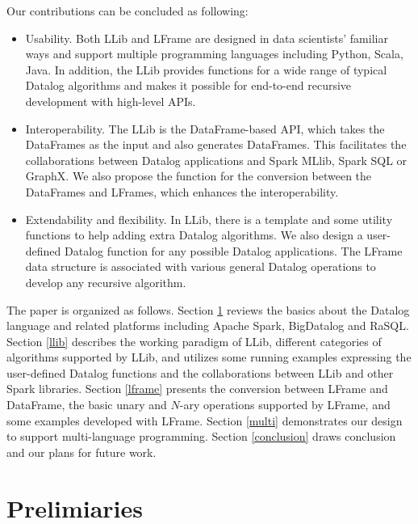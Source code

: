 Our contributions can be concluded as following:
\begin{itemize}
	\item Usability. Both LLib and LFrame are designed in data scientists' familiar ways and support multiple programming languages including Python, Scala, Java. In addition, the LLib  provides functions for a wide range of typical Datalog algorithms and makes it possible for end-to-end  recursive development  with high-level APIs.
	\item Interoperability. The LLib is the DataFrame-based API, which takes the DataFrames as the input and also generates DataFrames. This facilitates the collaborations between Datalog applications and Spark MLlib, Spark SQL or GraphX. We also propose the function for the conversion between the  DataFrames and LFrames, which enhances the interoperability.
	\item Extendability and flexibility. In LLib, there is a template and some utility functions to help  adding extra Datalog algorithms. We also design a user-defined Datalog function for any possible Datalog applications. The LFrame data structure is associated with various general Datalog operations to develop any recursive algorithm.
\end{itemize}
The paper is organized as follows. Section \ref{pre} reviews the basics about the Datalog language and related platforms including Apache Spark, BigDatalog and RaSQL. Section \ref{llib} describes the working paradigm of LLib,  different categories of algorithms supported by LLib, and utilizes some running examples expressing the user-defined Datalog functions and the collaborations between LLib and other Spark libraries. 
Section \ref{lframe} presents the conversion between LFrame and DataFrame, the basic unary and $N$-ary operations supported by LFrame, and some examples developed with LFrame. Section \ref{multi} demonstrates our design to support multi-language programming. Section \ref{conclusion} draws  conclusion and our plans for future work.

\section{Prelimiaries}

\label{pre}
